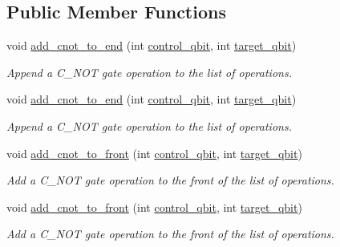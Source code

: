 \subsection*{Public Member Functions}
\begin{DoxyCompactItemize}
\item 
void \hyperlink{class_operation__block_a3779e559654f12c5544129c46305b6ce}{add\+\_\+cnot\+\_\+to\+\_\+end} (int \hyperlink{class_operation_a9a798ea8adec5a45fd2ca07996da88e1}{control\+\_\+qbit}, int \hyperlink{class_operation_a3e489b72c124b494777c71b1646bb1e9}{target\+\_\+qbit})
\begin{DoxyCompactList}\small\item\em Append a C\+\_\+\+N\+OT gate operation to the list of operations. \end{DoxyCompactList}\item 
void \hyperlink{class_operation__block_a3779e559654f12c5544129c46305b6ce}{add\+\_\+cnot\+\_\+to\+\_\+end} (int \hyperlink{class_operation_a9a798ea8adec5a45fd2ca07996da88e1}{control\+\_\+qbit}, int \hyperlink{class_operation_a3e489b72c124b494777c71b1646bb1e9}{target\+\_\+qbit})
\begin{DoxyCompactList}\small\item\em Append a C\+\_\+\+N\+OT gate operation to the list of operations. \end{DoxyCompactList}\item 
void \hyperlink{class_operation__block_a207dfeddc26d79125a58e2c282bb0987}{add\+\_\+cnot\+\_\+to\+\_\+front} (int \hyperlink{class_operation_a9a798ea8adec5a45fd2ca07996da88e1}{control\+\_\+qbit}, int \hyperlink{class_operation_a3e489b72c124b494777c71b1646bb1e9}{target\+\_\+qbit})
\begin{DoxyCompactList}\small\item\em Add a C\+\_\+\+N\+OT gate operation to the front of the list of operations. \end{DoxyCompactList}\item 
void \hyperlink{class_operation__block_a207dfeddc26d79125a58e2c282bb0987}{add\+\_\+cnot\+\_\+to\+\_\+front} (int \hyperlink{class_operation_a9a798ea8adec5a45fd2ca07996da88e1}{control\+\_\+qbit}, int \hyperlink{class_operation_a3e489b72c124b494777c71b1646bb1e9}{target\+\_\+qbit})
\begin{DoxyCompactList}\small\item\em Add a C\+\_\+\+N\+OT gate operation to the front of the list of operations. \end{DoxyCompactList}\item 

\end{DoxyCompactItemize}
